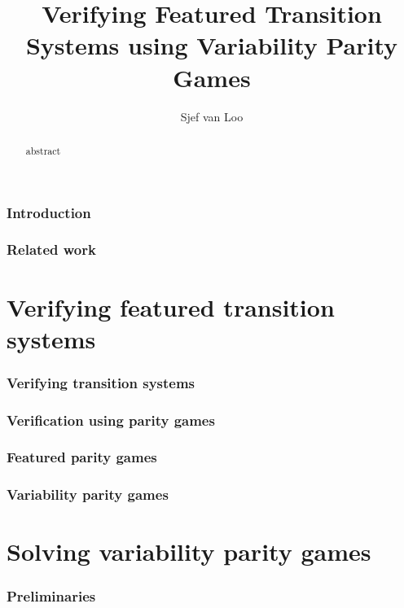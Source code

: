 \documentclass[]{article}
\title{Verifying Featured Transition Systems using Variability Parity Games}
\author{Sjef van Loo}
\begin{document}
\maketitle
\begin{abstract}
	abstract
\end{abstract}

\newpage
\tableofcontents

\pagebreak
\section{Introduction}


\section{Related work}


\pagebreak
\part{Verifying featured transition systems}
\label{part:verifying}

\section{Verifying transition systems}


\section{Verification using parity games}


\section{Featured parity games}


\section{Variability parity games}


\pagebreak
\part{Solving variability parity games}


\section{Preliminaries}

\end{document}
